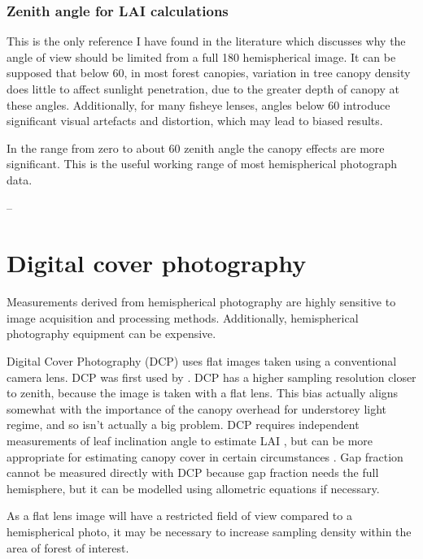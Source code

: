 \documentclass[11pt,a4paper]{article}
\begin{document}
\subsubsection{Zenith angle for LAI calculations} \label{fov}

This is the only reference I have found in the literature which discusses why the angle of view should be limited from a full 180\textdegree{} hemispherical image. It can be supposed that below 60\textdegree{}, in most forest canopies, variation in tree canopy density does little to affect sunlight penetration, due to the greater depth of canopy at these angles. Additionally, for many fisheye lenses, angles below 60\textdegree{} introduce significant visual artefacts and distortion, which may lead to biased results. 

\begin{minipage}{\linewidth}
\begin{framed}
In the range from zero to about 60 zenith angle the canopy effects are more significant. This is the useful working range of most hemispherical photograph data.

-- \citet{Jupp2009}
\end{framed}
\end{minipage}

\section{Digital cover photography}

Measurements derived from hemispherical photography are highly sensitive to image acquisition and processing methods. Additionally, hemispherical photography equipment can be expensive.

Digital Cover Photography (DCP) uses flat images taken using a conventional camera lens. DCP was first used by \citet{Macfarlane2007a}. DCP has a higher sampling resolution closer to zenith, because the image is taken with a flat lens. This bias actually aligns somewhat with the importance of the canopy overhead for understorey light regime, and so isn't actually a big problem. DCP requires independent measurements of leaf inclination angle to estimate LAI \citep{Ryu2010}, but can be more appropriate for estimating canopy cover in certain circumstances \citep{Pekin2009}. Gap fraction cannot be measured directly with DCP because gap fraction needs the full hemisphere, but it can be modelled using allometric equations if necessary.

As a flat lens image will have a restricted field of view compared to a hemispherical photo, it may be necessary to increase sampling density within the area of forest of interest. 
\end{document}
